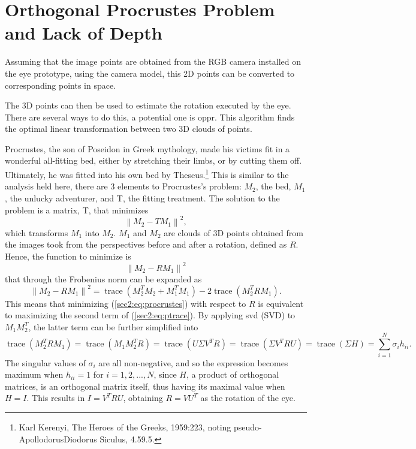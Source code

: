 
\section{Orthogonal Procrustes Problem and Lack of Depth}
\label{cha2:opprandsphere}

Assuming that the image points are obtained from the RGB camera installed on the eye prototype, using the camera model, this 2D points can be converted to corresponding points in space. 

The 3D points can then be used to estimate the rotation executed by the eye. There are several ways to do this, a potential one is \acrfull{oppr}. This algorithm finds the optimal linear transformation between two 3D clouds of points.

Procrustes, the son of Poseidon in Greek mythology, made his victims fit in a wonderful all-fitting bed, either by stretching their limbs, or by cutting them off. Ultimately, he was fitted into his own bed by Theseus.\footnote{Karl Kerenyi, The Heroes of the Greeks, 1959:223, noting pseudo-ApollodorusDiodorus Siculus, 4.59.5.} This is similar to the analysis held here, there are 3 elements to Procrustes's problem: $M_2$, the bed, $M_1$, the unlucky adventurer, and T, the fitting treatment. The solution to the problem is a matrix, T, that minimizes
\begin{equation}
\label{sec2:eq:procrustes}
\left \| M_2 - TM_1  \right \|^2 ,
\end{equation}
which transforms $M_1$ into $M_2$. $M_1$ and $M_2$ are clouds of 3D points obtained from the images took from the perspectives before and after a rotation, defined as $R$. Hence, the function to minimize is
\begin{equation}
\label{sec2:eq:ptrace}
\left \| M_2 - RM_1 \right \|^2 
\end{equation}
that through the Frobenius norm can be expanded as
\begin{equation}
\label{sec2:eq:ptrace}
\left \| M_2 - RM_1 \right \|^2 = \operatorname { trace } ( M_2^T M_2 + M_1^T M_1) - 2 \operatorname { trace } (M_2^T R M_1).
\end{equation}
This means that minimizing (\ref{sec2:eq:procrustes}) with respect to $R$ is equivalent to maximizing the second term of (\ref{sec2:eq:ptrace}). By applying \gls{svd} (SVD) to $M_1 M_2^T$, the latter term can be further simplified into
\begin{equation}
\label{sec2:eq:svd}
\operatorname { trace } (M_2^T R M_1) = \operatorname { trace } (M_1 M_2^T  R) = \operatorname { trace } ( U \Sigma V^T R) = \operatorname { trace } (\Sigma V^T R U) = \operatorname { trace } (\Sigma H )  = \sum _ { i = 1 } ^ { N } \sigma _ { i }h _ { i i } .
\end{equation}
The singular values of $\sigma _ { i }$ are all non-negative, and so the expression becomes maximum when $h _ { i i } = 1$ for $i=1,2,...,N$, since $H$, a product of orthogonal matrices, is an orthogonal matrix itself, thus having its maximal value when $H = I$. This results in $I = V^T R U$, obtaining $R=V U^T$ as the rotation of the eye.   

